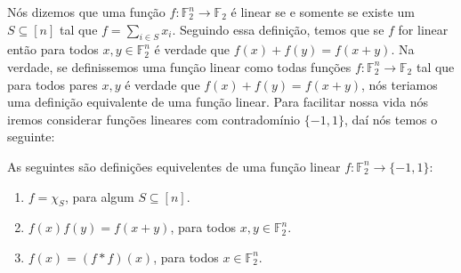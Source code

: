 Nós dizemos que uma função $f: \mathbb{F}_{2}^{n} \to \mathbb{F}_{2}$ é linear se e somente se existe um $S \subseteq [n]$ tal que $f = \sum_{i \in S}x_{i}$. Seguindo essa definição, temos que se $f$ for linear então para todos $x, y \in \mathbb{F}_{2}^{n}$ é verdade que $f(x) + f(y) = f(x + y)$. Na verdade, se definissemos uma função linear como todas funções $f: \mathbb{F}_{2}^{n} \to \mathbb{F}_{2}$ tal que para todos pares $x, y$ é verdade que $f(x) + f(y) = f(x + y)$, nós teriamos uma definição equivalente de uma função linear. Para facilitar nossa vida nós iremos considerar funções lineares com contradomínio $\{-1, 1\}$, daí nós temos o seguinte:

\begin{prop} \label{linear_f_defi}

As seguintes são definições equivelentes de uma função linear $f: \mathbb{F}_{2}^{n} \to \{-1, 1\}$:

\begin{enumerate}

	\item $f = \chi_{S}$, para algum $S \subseteq [n]$.
	
	\item $f(x)f(y) = f(x + y)$, para todos $x,y \in \mathbb{F}_{2}^{n}$.
	
	\item $f(x) = (f*f)(x)$, para todos $x \in \mathbb{F}_{2}^{n}$.

\end{enumerate}

\end{prop}

